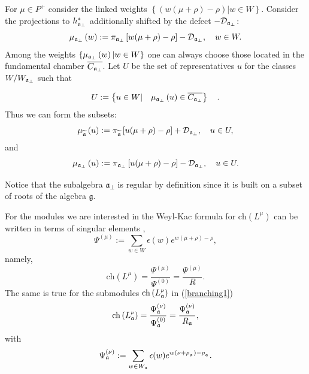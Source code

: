 \documentclass[12pt]{article}
\theoremstyle{definition}
\begin{document}
For $\mu \in P^{+}$ consider the linked weights $\left\{
\left( w(\mu +\rho )-\rho \right) |w\in W\right\} $. Consider the projections to
$h_{\frak{a}_{\perp }}^{\ast }$ additionally shifted by the defect $-%
\mathcal{D}_{\frak{a}_{\perp }}$:
\begin{equation*}
\mu _{\frak{a}_{\perp }}\left( w\right) :=\pi _{\frak{a}_{\perp }}\left[
w(\mu +\rho )-\rho \right] -\mathcal{D}_{\frak{a}_{\perp }},\quad w\in W.
\end{equation*}
Among the weights $\left\{ \mu _{\frak{a}_{\perp
}}\left( w\right) |w\in W\right\} $ one can always choose those located in
the fundamental chamber $\overline{C_{\frak{a}_{\perp }}}$. Let $U$ be the
set of representatives $u$ for the classes $W/W_{\frak{a}_{\perp }}$ such
that

\begin{equation}
U:=\left\{ u\in W|\quad \mu _{\frak{a}_{\perp }}\left( u\right) \in
\overline{C_{\frak{a}_{\perp }}}\right\} \quad .  \label{U-def}
\end{equation}
Thus we can form the subsets:
\begin{equation}
\mu _{\widetilde{\mathfrak{a}}}\left( u\right) :=\pi _{\widetilde{%
\mathfrak{a}}}\left[ u(\mu +\rho )-\rho \right] +\mathcal{D}_{\frak{a}%
_{\perp }},\quad u\in U,  \label{mu-a}
\end{equation}
and
\begin{equation}
\mu _{\frak{a}_{\perp }}\left( u\right) :=\pi _{\frak{a}_{\perp }}\left[
u(\mu +\rho )-\rho \right] -\mathcal{D}_{\frak{a}_{\perp }},\quad u\in U.
\label{mu-a-tilda}
\end{equation}

Notice that the subalgebra $\mathfrak{a}_{\bot}$ is regular by definition
since it is built on a subset of roots of the algebra $\mathfrak{g}$.

For the modules we are interested in the Weyl-Kac formula for $\mathrm{ch}%
\left( L^{\mu }\right) $ can be written in terms of singular elements \cite
{humphreys1997introduction},
\begin{equation*}
\Psi ^{\left( \mu \right) }:=\sum\limits_{w\in W}\epsilon (w)e^{w(\mu +\rho
)-\rho },
\end{equation*}
namely,
\begin{equation}
\mathrm{ch}\left( L^{\mu }\right) =\frac{\Psi ^{\left( \mu \right) }}{\Psi
^{\left( 0\right) }}=\frac{\Psi ^{\left( \mu \right) }}{R}.
\label{Weyl-Kac2}
\end{equation}
The same is true for the submodules $\mathrm{ch}\left( L_{\frak{a}}^{\nu
}\right) $ in (\ref{branching1})
\begin{equation*}
\mathrm{ch}\left( L_{\frak{a}}^{\nu }\right) =\frac{\Psi _{\frak{a}}^{\left(
\nu \right) }}{\Psi _{\frak{a}}^{\left( 0\right) }}=\frac{\Psi _{\frak{a}%
}^{\left( \nu \right) }}{R_{\frak{a}}},
\end{equation*}
with
\begin{equation*}
\Psi _{\frak{a}}^{\left( \nu \right) }:=\sum\limits_{w\in W_{\frak{a}%
}}\epsilon (w)e^{w(\nu +\rho _{_{\frak{a}}})-\rho _{_{\frak{a}}}}.
\end{equation*}
\end{document}
